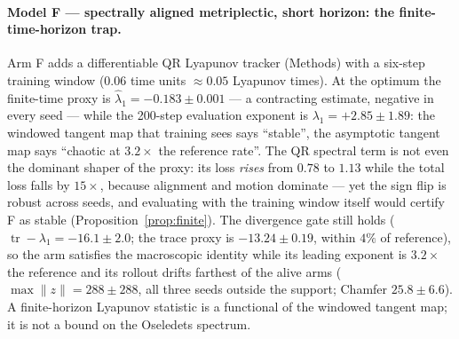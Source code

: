 \documentclass[11pt]{article}
\newcommand{\tr}{\operatorname{tr}}
\begin{document}
\paragraph{Model F --- spectrally aligned metriplectic, short horizon:
the finite-time-horizon trap.}
Arm F adds a differentiable QR Lyapunov tracker (Methods) with a
six-step training window ($0.06$ time units $\approx0.05$ Lyapunov
times). At the optimum the finite-time proxy is $\hat\lambda_1=
-0.183\pm0.001$ --- a contracting estimate, negative in every seed ---
while the 200-step evaluation exponent is $\lambda_1=+2.85\pm1.89$:
the windowed tangent map that training sees says ``stable'', the
asymptotic tangent map says ``chaotic at $3.2\times$ the reference
rate''. The QR spectral term is not even the dominant shaper of the
proxy: its loss \emph{rises} from $0.78$ to $1.13$ while the total
loss falls by $15\times$, because alignment and motion dominate --- yet
the sign flip is robust across seeds, and evaluating with the training
window itself would certify F as stable (Proposition~\ref{prop:finite}).
The divergence gate still holds ($\tr-\lambda_1=-16.1\pm2.0$; the
trace proxy is $-13.24\pm0.19$, within $4\%$ of reference), so the arm
satisfies the macroscopic identity while its leading exponent is
$3.2\times$ the reference and its rollout drifts farthest of the alive
arms ($\max\|z\|=288\pm288$, all three seeds outside the support;
Chamfer $25.8\pm6.6$). A finite-horizon Lyapunov statistic is a
functional of the windowed tangent map; it is not a bound on the
Oseledets spectrum.
\end{document}
